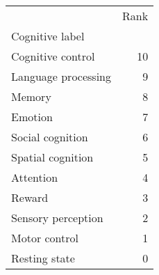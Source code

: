 \begin{tabular}{lr}
\toprule
{} &  Rank \\
Cognitive label     &       \\
\midrule
Cognitive control   &    10 \\
Language processing &     9 \\
Memory              &     8 \\
Emotion             &     7 \\
Social cognition    &     6 \\
Spatial cognition   &     5 \\
Attention           &     4 \\
Reward              &     3 \\
Sensory perception  &     2 \\
Motor control       &     1 \\
Resting state       &     0 \\
\bottomrule
\end{tabular}
